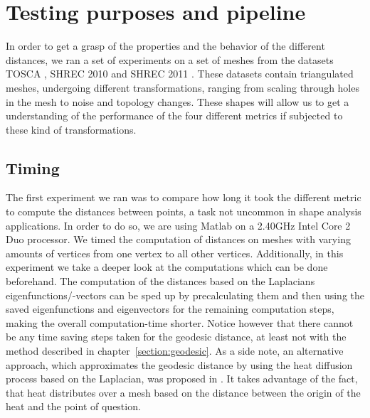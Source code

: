 \chapter{Testing purposes and pipeline}
\label{chapter:testing}


In order to get a grasp of the properties and the behavior of the different distances, we ran a set of experiments on a set of meshes from the datasets TOSCA \cite{bronstein2008numerical}, SHREC 2010 \cite{bronstein2010shrec} and SHREC 2011 \cite{dutagaci2011shrec}.
These datasets contain triangulated meshes, undergoing different transformations, ranging from scaling through holes in the mesh to noise and topology changes.
These shapes will allow us to get a understanding of the performance of the four different metrics if subjected to these kind of transformations.

\section{Timing}

The first experiment we ran was to compare how long it took the different metric to compute the distances between points, a task not uncommon in shape analysis applications.
In order to do so, we are using Matlab on a 2.40GHz Intel Core 2 Duo processor.
We timed the computation of distances on meshes with varying amounts of vertices from one vertex to all other vertices.
Additionally, in this experiment we take a deeper look at the computations which can be done beforehand.
The computation of the distances based on the Laplacians eigenfunctions/-vectors can be sped up by precalculating them and then using the saved eigenfunctions and eigenvectors for the remaining computation steps, making the overall computation-time shorter.
Notice however that there cannot be any time saving steps taken for the geodesic distance, at least not with the method described in chapter~\ref{section:geodesic}.
As a side note, an alternative approach, which approximates the geodesic distance by using the heat diffusion process based on the Laplacian, was proposed in \cite{crane2013geodesics}.
It takes advantage of the fact, that heat distributes over a mesh based on the distance between the origin of the heat and the point of question.

